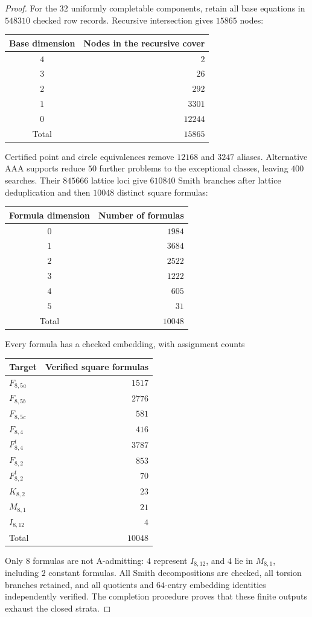 \documentclass[11pt,a4paper]{article}
\theoremstyle{plain}
\theoremstyle{definition}
\numberwithin{equation}{section}
\begin{document}
\begin{proof}
For the $32$ uniformly completable components, retain all base equations in $548310$ checked row records. Recursive intersection gives $15865$ nodes:
\begin{center}\begin{tabular}{cr}
\toprule
Base dimension & Nodes in the recursive cover\\
\midrule
$4$&$2$\\
$3$&$26$\\
$2$&$292$\\
$1$&$3301$\\
$0$&$12244$\\
\midrule
Total&$15865$\\
\bottomrule
\end{tabular}\end{center}
Certified point and circle equivalences remove $12168$ and $3247$ aliases. Alternative AAA supports reduce $50$ further problems to the exceptional classes, leaving $400$ searches. Their $845666$ lattice loci give $610840$ Smith branches after lattice deduplication and then $10048$ distinct square formulas:
\begin{center}\begin{tabular}{cr}
\toprule
Formula dimension & Number of formulas\\
\midrule
$0$&$1984$\\
$1$&$3684$\\
$2$&$2522$\\
$3$&$1222$\\
$4$&$605$\\
$5$&$31$\\
\midrule
Total&$10048$\\
\bottomrule
\end{tabular}\end{center}
Every formula has a checked embedding, with assignment counts
\begin{center}\begin{tabular}{lr}
\toprule
Target & Verified square formulas\\
\midrule
$F_{8,5a}$ & $1517$\\
$F_{8,5b}$ & $2776$\\
$F_{8,5c}$ & $581$\\
$F_{8,4}$ & $416$\\
$F_{8,4}^{t}$ & $3787$\\
$F_{8,2}$ & $853$\\
$F_{8,2}^{t}$ & $70$\\
$K_{8,2}$ & $23$\\
$M_{8,1}$ & $21$\\
$I_{8,12}$ & $4$\\
\midrule
Total & $10048$\\
\bottomrule
\end{tabular}\end{center}
Only $8$ formulas are not A-admitting: $4$ represent $I_{8,12}$, and $4$ lie in $M_{8,1}$, including $2$ constant formulas. All Smith decompositions are checked, all torsion branches retained, and all quotients and $64$-entry embedding identities independently verified. The completion procedure proves that these finite outputs exhaust the closed strata.
\end{proof}
\end{document}
